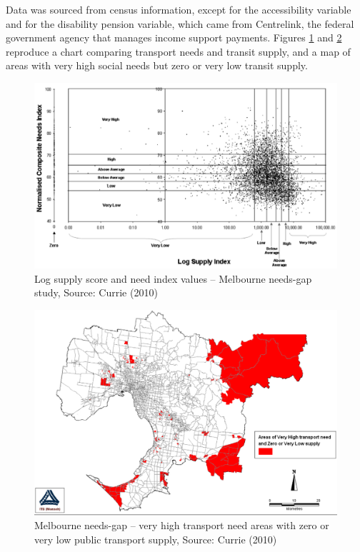 \documentclass[preprint, 3p,
authoryear]{elsarticle} %
\begin{document}
Data was sourced from census information, except for the accessibility
variable and for the disability pension variable, which came from
Centrelink, the federal government agency that manages income support
payments. Figures \ref{fig:Currie_chart_gap} and
\ref{fig:Currie_map_gap} reproduce a chart comparing transport needs and
transit supply, and a map of areas with very high social needs but zero
or very low transit supply.

\begin{figure}
\includegraphics[width=1\linewidth]{graphics/Currie2010chart} \caption{Log supply score and need index values – Melbourne needs-gap study, Source: Currie (2010)}\label{fig:Currie_chart_gap}
\end{figure}

\begin{figure}
\includegraphics[width=1\linewidth]{graphics/Currie2010gap} \caption{Melbourne needs-gap – very high transport need areas with zero or very low public transport supply, Source: Currie (2010)}\label{fig:Currie_map_gap}
\end{figure}
\end{document}
